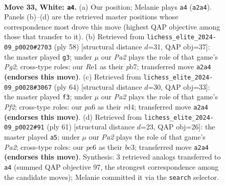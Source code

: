 \documentclass[11pt]{article}
\begin{document}
\clearpage

\begin{figure}[p]\centering
\begin{subfigure}{0.46\textwidth}\centering
\resizebox{\linewidth}{!}{%
\newchessgame
\chessboard[
  setfen={1r6/1p3p2/p3p1k1/8/7p/4PP2/PR4PP/4R1K1 w - - 1 33},
  showmover=false,
  pgfstyle=straightmove, color=movearrow, markmove={a2-a4}
]}
\caption{}
\end{subfigure}\hfill
\begin{subfigure}{0.46\textwidth}\centering
\resizebox{\linewidth}{!}{%
\newchessgame
\chessboard[
  setfen={8/pp2kp2/3rp3/5p1p/5P2/1P6/PK2R1PP/8 w - - 0 30},
  showmover=false,
  pgfstyle=straightmove, color=movearrow, markmove={g2-g3}
]}
\caption{}
\end{subfigure}
\\[4pt]
\begin{subfigure}{0.46\textwidth}\centering
\resizebox{\linewidth}{!}{%
\newchessgame
\chessboard[
  setfen={4r3/5pk1/6p1/2p1p3/1p1r4/1P6/2P1RPPP/R5K1 w - - 3 33},
  showmover=false,
  pgfstyle=straightmove, color=movearrow, markmove={f2-f3}
]}
\caption{}
\end{subfigure}\hfill
\begin{subfigure}{0.46\textwidth}\centering
\resizebox{\linewidth}{!}{%
\newchessgame
\chessboard[
  setfen={2r3k1/p2r3p/6p1/1p1P4/2p1PP1P/P1B2P2/6K1/3R4 b - - 0 31},
  showmover=false,
  pgfstyle=straightmove, color=movearrow, markmove={a7-a5}
]}
\caption{}
\end{subfigure}
\caption{\textbf{Move 33, White: \texttt{a4}.} (a) Our position; Melanie plays \texttt{a4} (\texttt{a2a4}). Panels (b)--(d) are the retrieved master positions whose correspondence most drove this move (highest QAP objective among those that transfer to it). (b) Retrieved from \texttt{lichess\_elite\_2024-09\_p0020\#2703} (ply 58) [structural distance $d$=31, QAP obj=37]: the master played \texttt{g3}; under $\mu$ our \emph{Pa2} plays the role of that game's \emph{Pg2}; cross-type roles: our \emph{R}e1 as their \emph{p}b7; transferred move \texttt{a2a4} \textbf{(endorses this move)}. (c) Retrieved from \texttt{lichess\_elite\_2024-09\_p0028\#3067} (ply 64) [structural distance $d$=30, QAP obj=33]: the master played \texttt{f3}; under $\mu$ our \emph{Pa2} plays the role of that game's \emph{Pf2}; cross-type roles: our \emph{p}a6 as their \emph{r}d4; transferred move \texttt{a2a4} \textbf{(endorses this move)}. (d) Retrieved from \texttt{lichess\_elite\_2024-09\_p0022\#91} (ply 61) [structural distance $d$=23, QAP obj=26]: the master played \texttt{a5}; under $\mu$ our \emph{Pa2} plays the role of that game's \emph{Pa2}; cross-type roles: our \emph{p}e6 as their \emph{b}c3; transferred move \texttt{a2a4} \textbf{(endorses this move)}. Synthesis: 3 retrieved analogs transferred to \texttt{a4} (summed QAP objective 97, the strongest correspondence among the candidate moves); Melanie committed it via the \texttt{search} selector.}
\label{fig:thought-m64}
\end{figure}
\end{document}
